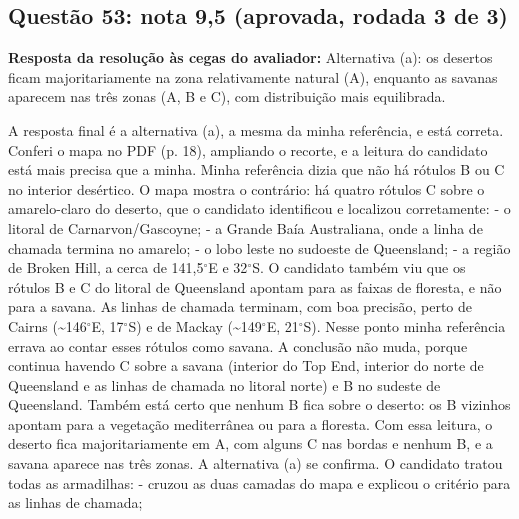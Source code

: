\documentclass{article}%
\begin{document}
\subsection*{Questão 53: nota 9,5 (aprovada, rodada 3 de 3)}%
\textbf{Resposta da resolução às cegas do avaliador:} Alternativa (a): os desertos ficam majoritariamente na zona relativamente natural (A), enquanto as savanas aparecem nas três zonas (A, B e C), com distribuição mais equilibrada.\par %
A resposta final é a alternativa (a), a mesma da minha referência, e está correta.\newline%
\newline%
Conferi o mapa no PDF (p. 18), ampliando o recorte, e a leitura do candidato está mais precisa que a minha. Minha referência dizia que não há rótulos B ou C no interior desértico. O mapa mostra o contrário: há quatro rótulos C sobre o amarelo{-}claro do deserto, que o candidato identificou e localizou corretamente:\newline%
{-} o litoral de Carnarvon/Gascoyne;\newline%
{-} a Grande Baía Australiana, onde a linha de chamada termina no amarelo;\newline%
{-} o lobo leste no sudoeste de Queensland;\newline%
{-} a região de Broken Hill, a cerca de 141,5$^\circ$E e 32$^\circ$S.\newline%
\newline%
O candidato também viu que os rótulos B e C do litoral de Queensland apontam para as faixas de floresta, e não para a savana. As linhas de chamada terminam, com boa precisão, perto de Cairns (\textasciitilde{}146$^\circ$E, 17$^\circ$S) e de Mackay (\textasciitilde{}149$^\circ$E, 21$^\circ$S). Nesse ponto minha referência errava ao contar esses rótulos como savana. A conclusão não muda, porque continua havendo C sobre a savana (interior do Top End, interior do norte de Queensland e as linhas de chamada no litoral norte) e B no sudeste de Queensland. Também está certo que nenhum B fica sobre o deserto: os B vizinhos apontam para a vegetação mediterrânea ou para a floresta.\newline%
\newline%
Com essa leitura, o deserto fica majoritariamente em A, com alguns C nas bordas e nenhum B, e a savana aparece nas três zonas. A alternativa (a) se confirma. O candidato tratou todas as armadilhas:\newline%
{-} cruzou as duas camadas do mapa e explicou o critério para as linhas de chamada;\newline%
\end{document}
